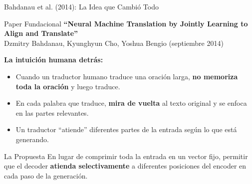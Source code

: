 \documentclass[aspectratio=169]{beamer}
\begin{document}
\begin{frame}{Bahdanau et al. (2014): La Idea que Cambió Todo}
    \begin{block}{Paper Fundacional}
        \textbf{``Neural Machine Translation by Jointly Learning to Align and Translate''} \\
        Dzmitry Bahdanau, Kyunghyun Cho, Yoshua Bengio (septiembre 2014)
    \end{block}
    
    \vspace{0.3cm}
    \textbf{La intuición humana detrás:}
    \begin{itemize}
        \item Cuando un traductor humano traduce una oración larga, \textbf{no memoriza toda la oración} y luego traduce.
        \item En cada palabra que traduce, \textbf{mira de vuelta} al texto original y se enfoca en las partes relevantes.
        \item Un traductor ``atiende'' diferentes partes de la entrada según lo que está generando.
    \end{itemize}
    
    \vspace{0.3cm}
    \begin{exampleblock}{La Propuesta}
        En lugar de comprimir toda la entrada en un vector fijo, permitir que el decoder \textbf{atienda selectivamente} a diferentes posiciones del encoder en cada paso de la generación.
    \end{exampleblock}
\end{frame}
\end{document}
